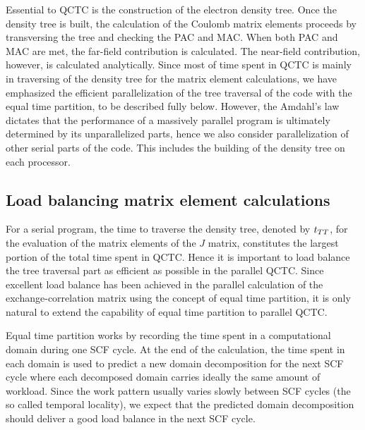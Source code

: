 \commentoutA{\documentclass[prl,aps,twocolumn,twocolumngrid,superbib]{revtex4}}
\begin{document}
Essential to QCTC is the construction of the electron density tree.
Once the density tree is built, the calculation of the Coulomb matrix
elements proceeds by transversing the tree and checking the PAC and
MAC. When both PAC and MAC are met, the far-field contribution is
calculated.  The near-field contribution, however, is calculated
analytically.  Since most of time spent in QCTC is mainly in
traversing of the density tree for the matrix element calculations, we
have emphasized the efficient parallelization of the tree traversal of
the code with the equal time partition, to be described fully
below. However, the Amdahl's law dictates that the performance of a
massively parallel program is ultimately determined by its
unparallelized parts, hence we also consider parallelization of other
serial parts of the code. This includes the building of the density
tree on each processor.  

\subsection{Load balancing matrix element calculations}
\label{ETPartition}
For a serial program, the time to traverse the density tree, denoted
by $t_{TT}$, for the evaluation of the matrix elements of the $J$
matrix, constitutes the largest portion of the total time spent in
QCTC.  Hence it is important to load balance the tree traversal part
as efficient as possible in the parallel QCTC.  Since excellent load
balance has been achieved in the parallel calculation of the
exchange-correlation matrix using the concept of equal time
partition\cite{CGan03}, it is only natural to extend the capability of
equal time partition to parallel QCTC.

Equal time partition works by recording the time spent in a
computational domain during one SCF cycle. At the end of the
calculation, the time spent in each domain is used to predict a new
domain decomposition for the next SCF cycle where each decomposed
domain carries ideally the same amount of workload. Since the work
pattern usually varies slowly between SCF cycles (the so called
temporal locality\cite{JPilkington96}), we expect that the predicted
domain decomposition should deliver a good load balance in the next
SCF cycle.
\end{document}
